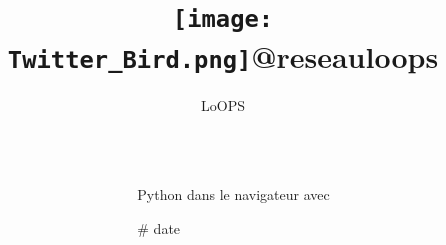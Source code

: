\documentclass[final]{beamer}
\title{\texttt{[image: Twitter\_Bird.png]}@reseauloops}%
\author{LoOPS} %
\institute{@reseauloops} %
\newlength{\sepwid}
\newlength{\twocolwid}
\begin{document}

\setlength{\belowcaptionskip}{3ex} %
\setlength\belowdisplayshortskip{3ex} %


\begin{frame}[t] %

	\begin{columns}[t] %

		\begin{column}{\sepwid}\end{column} %

		\begin{column}{\twocolwid} %


			\begin{alertblock}{\Large{Python dans le navigateur avec}}
			\end{alertblock}

			\vspace{-1.in}
			\begin{figure}%
				\centering
			\end{figure}

			\vspace{0.5in}
			\begin{block}{\# date}


\end{block}
\end{column}
\end{columns}
\end{frame}
\end{document}
